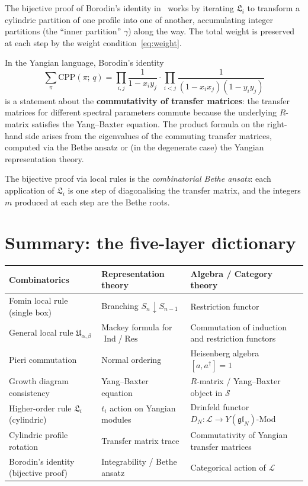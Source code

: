 \documentclass[12pt,a4paper]{article}
\theoremstyle{definition}
\theoremstyle{remark}
\newcommand{\gl}{\mathfrak{gl}}
\newcommand{\fU}{\mathfrak{U}}
\newcommand{\fL}{\mathfrak{L}}
\newcommand{\Ind}{\operatorname{Ind}}
\newcommand{\Res}{\operatorname{Res}}
\begin{document}
The bijective proof of Borodin's identity in~\cite{Langer} works by
iterating $\fL_i$ to transform a cylindric partition of one profile
into one of another, accumulating integer partitions (the ``inner
partition'' $\gamma$) along the way. The total weight is preserved at
each step by the weight condition~\eqref{eq:weight}.

In the Yangian language, Borodin's identity
\[
  \sum_{\pi} \mathrm{CPP}(\pi;\, q)
  = \prod_{i,j} \frac{1}{1 - x_i y_j} \cdot
    \prod_{i<j} \frac{1}{(1 - x_i x_j)(1 - y_i y_j)}
\]
is a statement about the \textbf{commutativity of transfer matrices}:
the transfer matrices for different spectral parameters commute
because the underlying $R$-matrix satisfies the Yang--Baxter equation.
The product formula on the right-hand side arises from the eigenvalues
of the commuting transfer matrices, computed via the Bethe ansatz or
(in the degenerate case) the Yangian representation theory.

The bijective proof via local rules is the \emph{combinatorial Bethe
ansatz}: each application of $\fL_i$ is one step of diagonalising the
transfer matrix, and the integers $m$ produced at each step are the
Bethe roots.

\section{Summary: the five-layer dictionary}
\label{sec:summary}

\begin{center}
\renewcommand{\arraystretch}{1.6}
\begin{tabular}{@{}p{3.2cm}p{4.5cm}p{5cm}@{}}
\toprule
\textbf{Combinatorics} & \textbf{Representation theory}
  & \textbf{Algebra / Category theory} \\
\midrule
Fomin local rule (single box)
  & Branching $S_n \downarrow S_{n-1}$
  & Restriction functor \\
General local rule $\fU_{\alpha,\beta}$
  & Mackey formula for $\Ind$/$\Res$
  & Commutation of induction and restriction functors \\
Pieri commutation
  & Normal ordering
  & Heisenberg algebra $[a, a^\dagger] = 1$ \\
Growth diagram consistency
  & Yang--Baxter equation
  & $R$-matrix / Yang--Baxter object in $\mathcal{S}$ \\
Higher-order rule $\fL_i$ (cylindric)
  & $t_i$ action on Yangian modules
  & Drinfeld functor $D_N : \mathcal{L} \to Y(\gl_N)$-Mod \\
Cylindric profile rotation
  & Transfer matrix trace
  & Commutativity of Yangian transfer matrices \\
Borodin's identity (bijective proof)
  & Integrability / Bethe ansatz
  & Categorical action of $\mathcal{L}$ \\
\bottomrule
\end{tabular}
\end{center}
\end{document}
